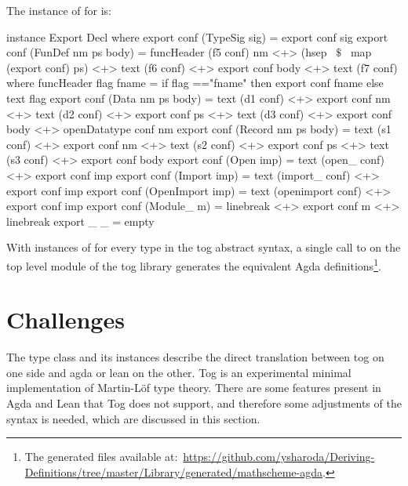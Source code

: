 The instance of  for  is:  
\begin{hscode}
instance Export Decl where
  export conf (TypeSig sig) = export conf sig 
  export conf (FunDef nm ps body) =
    funcHeader (f5 conf) nm <+> (hsep ~$\$$~ map (export conf) ps) 
    <+> text (f6 conf) <+> export conf body <+> text (f7 conf)
    where funcHeader flag fname = 
            if flag =="fname" then export conf fname else text flag    
  export conf (Data nm ps body) =
    text (d1 conf) <+> export conf nm <+> text (d2 conf) 
    <+> export conf ps <+> text (d3 conf) <+> export conf body 
    <+> openDatatype conf nm
  export conf (Record nm ps body) =
    text (s1 conf) <+> export conf nm <+> text (s2 conf) 
    <+> export conf ps <+> text (s3 conf) <+> export conf body 
  export conf (Open imp) = text (open_ conf) <+> export conf imp
  export conf (Import imp) = text (import_ conf) <+> export conf imp
  export conf (OpenImport imp) = 
    text (openimport conf) <+> export conf imp
  export conf (Module_ m) =
    linebreak <+> export conf m  <+> linebreak 
  export _ _ = empty
\end{hscode}

With instances of  for every type in the tog abstract syntax, a single call to  on the top level module of the tog library generates the equivalent Agda definitions\footnote{The generated files available at:~\url{https://github.com/ysharoda/Deriving-Definitions/tree/master/Library/generated/mathscheme-agda}.}.

\section{Challenges}
\label{sec:exporting:challenges}
The  type class and its instances describe the direct translation between tog on one side and agda or lean on the other. Tog is an experimental minimal implementation of Martin-L\"{o}f type theory. There are some features present in Agda and Lean that Tog does not support, and therefore some adjustments of the syntax is needed, which are discussed in this section. 

